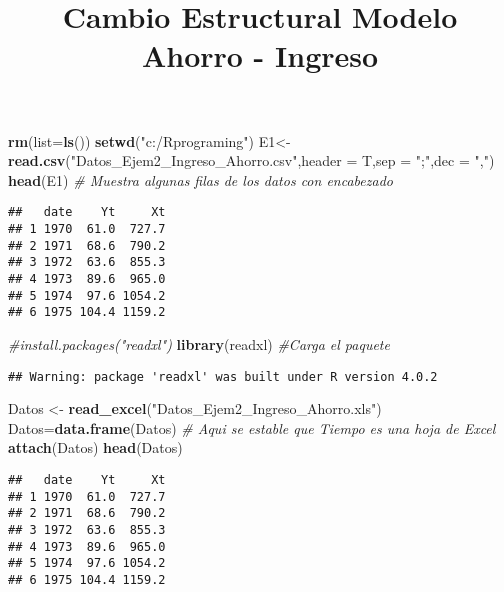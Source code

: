 \documentclass[
]{article}
\title{Cambio Estructural Modelo Ahorro - Ingreso}
\author{}
\date{\vspace{-2.5em}}
\newenvironment{Shaded}{\begin{snugshade}}{\end{snugshade}}
\newcommand{\CommentTok}[1]{\textcolor[rgb]{0.56,0.35,0.01}{\textit{#1}}}
\newcommand{\DataTypeTok}[1]{\textcolor[rgb]{0.13,0.29,0.53}{#1}}
\newcommand{\KeywordTok}[1]{\textcolor[rgb]{0.13,0.29,0.53}{\textbf{#1}}}
\newcommand{\NormalTok}[1]{#1}
\newcommand{\StringTok}[1]{\textcolor[rgb]{0.31,0.60,0.02}{#1}}
\begin{document}
\maketitle

\begin{Shaded}
\begin{Highlighting}[]
\KeywordTok{rm}\NormalTok{(}\DataTypeTok{list=}\KeywordTok{ls}\NormalTok{())}
\KeywordTok{setwd}\NormalTok{(}\StringTok{"c:/Rprograming"}\NormalTok{)}
\NormalTok{E1<-}\KeywordTok{read.csv}\NormalTok{(}\StringTok{"Datos_Ejem2_Ingreso_Ahorro.csv"}\NormalTok{,}\DataTypeTok{header =}\NormalTok{ T,}\DataTypeTok{sep =} \StringTok{";"}\NormalTok{,}\DataTypeTok{dec =} \StringTok{","}\NormalTok{)}
\KeywordTok{head}\NormalTok{(E1) }\CommentTok{# Muestra algunas filas de los datos con encabezado}
\end{Highlighting}
\end{Shaded}

\begin{verbatim}
##   date    Yt     Xt
## 1 1970  61.0  727.7
## 2 1971  68.6  790.2
## 3 1972  63.6  855.3
## 4 1973  89.6  965.0
## 5 1974  97.6 1054.2
## 6 1975 104.4 1159.2
\end{verbatim}

\begin{Shaded}
\begin{Highlighting}[]
\CommentTok{#install.packages("readxl")}
\KeywordTok{library}\NormalTok{(readxl) }\CommentTok{#Carga el paquete}
\end{Highlighting}
\end{Shaded}

\begin{verbatim}
## Warning: package 'readxl' was built under R version 4.0.2
\end{verbatim}

\begin{Shaded}
\begin{Highlighting}[]
\NormalTok{Datos <-}\StringTok{ }\KeywordTok{read_excel}\NormalTok{(}\StringTok{"Datos_Ejem2_Ingreso_Ahorro.xls"}\NormalTok{)}
\NormalTok{Datos=}\KeywordTok{data.frame}\NormalTok{(Datos) }\CommentTok{# Aqui se estable que Tiempo es una hoja de Excel}
\KeywordTok{attach}\NormalTok{(Datos)}
\KeywordTok{head}\NormalTok{(Datos)}
\end{Highlighting}
\end{Shaded}

\begin{verbatim}
##   date    Yt     Xt
## 1 1970  61.0  727.7
## 2 1971  68.6  790.2
## 3 1972  63.6  855.3
## 4 1973  89.6  965.0
## 5 1974  97.6 1054.2
## 6 1975 104.4 1159.2
\end{verbatim}
\end{document}
